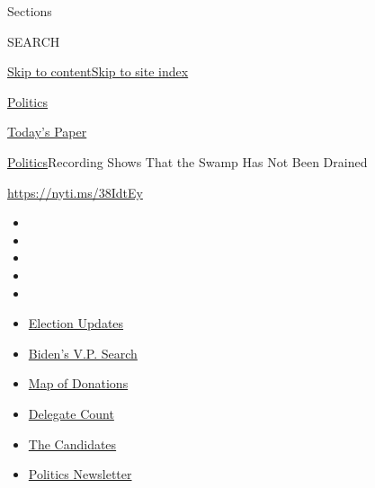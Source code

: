 Sections

SEARCH

\protect\hyperlink{site-content}{Skip to
content}\protect\hyperlink{site-index}{Skip to site index}

\href{https://www.nytimes.com/section/politics}{Politics}

\href{https://myaccount.nytimes.com/auth/login?response_type=cookie\&client_id=vi}{}

\href{https://www.nytimes.com/section/todayspaper}{Today's Paper}

\href{/section/politics}{Politics}\textbar{}Recording Shows That the
Swamp Has Not Been Drained

\url{https://nyti.ms/38IdtEy}

\begin{itemize}
\item
\item
\item
\item
\item
\end{itemize}

\begin{itemize}
\item
  \href{https://www.nytimes.com/2020/07/31/us/elections/biden-vs-trump.html?action=click\&pgtype=Article\&state=default\&region=TOP_BANNER\&context=storylines_menu}{Election
  Updates}
\item
  \href{https://www.nytimes.com/article/biden-vice-president-2020.html?action=click\&pgtype=Article\&state=default\&region=TOP_BANNER\&context=storylines_menu}{Biden's
  V.P. Search}
\item
  \href{https://www.nytimes.com/interactive/2020/07/24/us/politics/trump-biden-campaign-donors.html?action=click\&pgtype=Article\&state=default\&region=TOP_BANNER\&context=storylines_menu}{Map
  of Donations}
\item
  \href{https://www.nytimes.com/interactive/2020/us/elections/delegate-count-primary-results.html?action=click\&pgtype=Article\&state=default\&region=TOP_BANNER\&context=storylines_menu}{Delegate
  Count}
\item
  \href{https://www.nytimes.com/interactive/2019/us/politics/2020-presidential-candidates.html?action=click\&pgtype=Article\&state=default\&region=TOP_BANNER\&context=storylines_menu}{The
  Candidates}
\item
  \href{https://www.nytimes.com/newsletters/politics?action=click\&pgtype=Article\&state=default\&region=TOP_BANNER\&context=storylines_menu}{Politics
  Newsletter}
\end{itemize}

